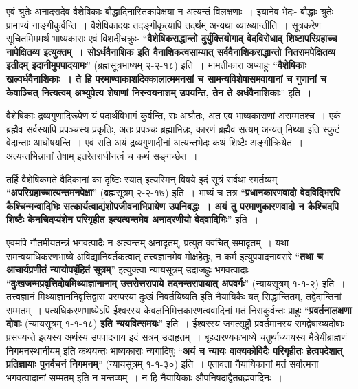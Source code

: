 {एवं श्रुतेः अनादरादेव वैशेषिकाः बौद्धादिनास्तिकापेक्षया न अत्यन्तं विलक्षणाः~। इयानेव भेदः- बौद्धाः श्रुतेः प्रामाण्यं नाङ्गीकुर्वन्ति~। वैशेषिकादयः तदङ्गीकृत्यापि तदर्थम् अन्यथा व्याख्यान्तीति~। सूत्रकरेण सूचितमिममर्थं भाष्यकाराः एवं विशदीचक्रुः- “\textbf{वैशेषिकराद्धान्तो दुर्युक्तियोगाद् वेदविरोधाद् शिष्टापरिग्रहाच्च नापेक्षितव्य इत्युक्तम्~। सोऽर्धवैनाशिक इति वैनाशिकत्वसाम्यात् सर्ववैनाशिकराद्धान्तो नितरामपेक्षितव्य इतीदम् इदानीमुपपादयामः}” (ब्रह्मसूत्रभाष्यम् २-२-१८) इति~। भामतीकारा अप्याहुः “\textbf{वैशेषिकाः खल्वर्धवैनाशिकाः~। ते हि परमाण्वाकाशदिक्कालात्ममनसां च सामन्यविशेषासमवायानां च गुणानां च केषाञ्चित् नित्यत्वम् अभ्युपेत्य शेषाणां निरन्वयनाशम् उपयन्ति, तेन ते अर्धवैनाशिकाः}” इति~। 

वैशेषिकाः द्रव्यगुणादिरूपेण यं पदार्थविभागं कुर्वन्ति, सः अश्रौतः, अत एव भाष्यकाराणां असम्मतश्च~। एकं ब्रह्मैव सर्वस्यापि प्रपञ्चस्य प्रकृतिः, अतः प्रपञ्चः ब्रह्माभिन्नः, कारणं ब्रह्मैव सत्यम् अन्यत् मिथ्या इति स्फुटं वेदान्ताः आघोषयन्ति~। एवं सति अयं द्रव्यगुणादीनां अत्यन्तभेदः कथं शिष्टैः अङ्गीक्रियेत~। अत्यन्तभिन्नानां तेषाम् इतरेतराधीनत्वं च कथं सङ्गच्छेत~। 

तर्हि वैशेषिकमते वैदिकानां का दृष्टिः स्यात् इत्यस्मिन् विषये इदं सूत्रं सर्वथा स्मर्तव्यम् “\textbf{अपरिग्रहाच्चात्यन्तमनपेक्षा}” (ब्रह्मसूत्रम् २-२-१७) इति~। भाष्यं च तत्र “\textbf{प्रधानकारणवादो वेदविद्भिरपि कैश्चिन्मन्वादिभिः सत्कार्यत्वाद्यंशोपजीवनाभिप्रायेण उपनिबद्धः~। अयं तु परमाणुकारणवादो न कैश्चिदपि शिष्टैः केनचिदप्यंशेन परिगृहीत इत्यत्यन्तमेव अनादरणीयो वेदवादिभिः}” इति~। 

एवमपि गौतमीयतन्त्रं भगवत्पादैः न अत्यन्तम् अनादृतम्, प्रत्युत क्वचित् समादृतम्~। यथा समन्वयाधिकरणभाष्ये अविद्यानिवर्तकत्वात् तत्त्वज्ञानमेव मोक्षहेतुः, न कर्म इत्युपपादनावसरे “\textbf{तथा च आचार्यप्रणीतं न्यायोपबृंहितं सूत्रम्}” इत्युक्त्वा न्यायसूत्रम् उदाजह्रुः भगवत्पादाः “\textbf{दुःखजन्मप्रवृत्तिदोषमिथ्याज्ञानानाम् उत्तरोत्तरापाये तदनन्तरापायात् अपवर्गः}” (न्यायसूत्रम् १-१-२) इति~। तत्त्वज्ञानं मिथ्याज्ञाननिवृत्तिद्वारा परम्परया दुःखं निवर्तयिष्यति इति नैयायिकैः यत् सिद्धान्तितम्, तद्वेदान्तिनां सम्मतम्~। पत्यधिकरणभाष्येऽपि ईश्वरस्य केवलनिमित्तकारणत्ववादिनां मतं निराकुर्वन्तः प्राहुः “\textbf{प्रवर्तनालक्षणा दोषाः} (न्यायसूत्रम् १-१-१८) \textbf{इति न्ययवित्समयः}” इति~। ईश्वरस्य जगत्सृष्ट्रौ प्रवर्तमानस्य रागद्वेषाख्यदोषाः प्रसज्यन्ते इत्यस्य अर्थस्य उपपादनाय इदं सत्रम् उदाहृतम्~। बृहदारण्यकभाष्ये चतुर्थाध्यायस्य मैत्रेयीब्राह्मणं निगमनस्थानीयम् इति कथयन्तः भाष्यकाराः न्यगादिषुः “\textbf{अयं च न्यायः वाक्यकोविदैः परिगृहीतः हेत्वपदेशात् प्रतिज्ञायाः पुनर्वचनं निगमनम्}” (न्यायसूत्रम् १-१-३०) इति~। एतावता नैयायिकानां मतं सर्वात्मना भगवत्पादानां सम्मतम् इति न मन्तव्यम्~। न हि नैयायिकाः औपनिषदाद्वैतब्रह्मवादिनः~। 

}
